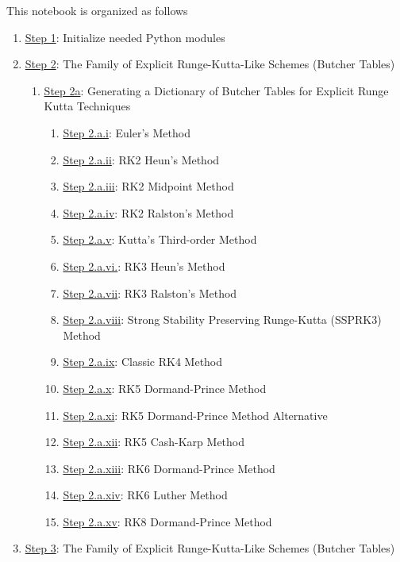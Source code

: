 \documentclass[landscape,letterpaper,10pt,english]{article}
\providecommand{\tightlist}{%
      \setlength{\itemsep}{0pt}\setlength{\parskip}{0pt}}
\begin{document}
This notebook is organized as follows

\begin{enumerate}
\def\labelenumi{\arabic{enumi}.}
\tightlist
\item
  \hyperref[initializenrpy]{Step 1}: Initialize needed Python modules
\item
  \hyperref[introbutcher]{Step 2}: The Family of Explicit
  Runge-Kutta-Like Schemes (Butcher Tables)

  \begin{enumerate}
  \def\labelenumii{\arabic{enumii}.}
  \tightlist
  \item
    \hyperref[codebutcher]{Step 2a}: Generating a Dictionary of Butcher
    Tables for Explicit Runge Kutta Techniques

    \begin{enumerate}
    \def\labelenumiii{\arabic{enumiii}.}
    \tightlist
    \item
      \hyperref[euler]{Step 2.a.i}: Euler's Method
    \item
      \hyperref[rktwoheun]{Step 2.a.ii}: RK2 Heun's Method
    \item
      \hyperref[rk2mp]{Step 2.a.iii}: RK2 Midpoint Method
    \item
      \hyperref[rk2ralston]{Step 2.a.iv}: RK2 Ralston's Method
    \item
      \hyperref[rk3]{Step 2.a.v}: Kutta's Third-order Method
    \item
      \hyperref[rk3heun]{Step 2.a.vi.}: RK3 Heun's Method
    \item
      \hyperref[rk3ralston]{Step 2.a.vii}: RK3 Ralston's Method
    \item
      \hyperref[ssprk3]{Step 2.a.viii}: Strong Stability Preserving
      Runge-Kutta (SSPRK3) Method
    \item
      \hyperref[rkfour]{Step 2.a.ix}: Classic RK4 Method
    \item
      \hyperref[dp5]{Step 2.a.x}: RK5 Dormand-Prince Method
    \item
      \hyperref[dp5alt]{Step 2.a.xi}: RK5 Dormand-Prince Method
      Alternative
    \item
      \hyperref[ck5]{Step 2.a.xii}: RK5 Cash-Karp Method
    \item
      \hyperref[dp6]{Step 2.a.xiii}: RK6 Dormand-Prince Method
    \item
      \hyperref[l6]{Step 2.a.xiv}: RK6 Luther Method
    \item
      \hyperref[dp8]{Step 2.a.xv}: RK8 Dormand-Prince Method
    \end{enumerate}
  \end{enumerate}
\item
  \hyperref[introbutchera]{Step 3}: The Family of Explicit
  Runge-Kutta-Like Schemes (Butcher Tables)


\end{enumerate}
\end{document}
